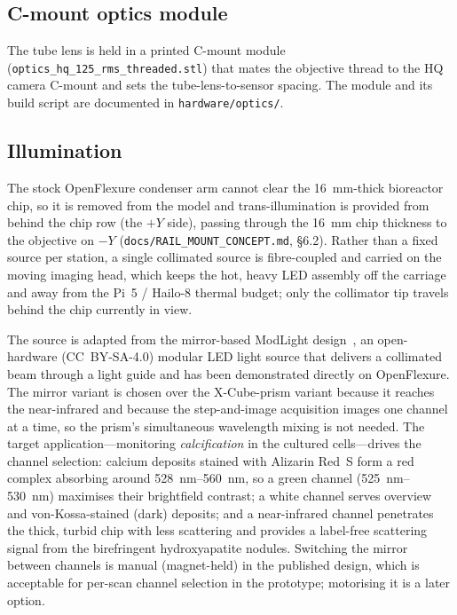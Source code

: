 \subsection{C-mount optics module}
The tube lens is held in a printed C-mount module
(\texttt{optics\_hq\_125\_rms\_threaded.stl}) that mates the objective thread to
the HQ camera C-mount and sets the tube-lens-to-sensor spacing. The module and
its build script are documented in \texttt{hardware/optics/}.

\subsection{Illumination}
The stock OpenFlexure condenser arm cannot clear the \SI{16}{\milli\meter}-thick
bioreactor chip, so it is removed from the model and trans-illumination is
provided from behind the chip row (the $+Y$ side), passing through the
\SI{16}{\milli\meter} chip thickness to the objective on $-Y$
(\texttt{docs/RAIL\_MOUNT\_CONCEPT.md}, \S6.2). Rather than a fixed source per
station, a single collimated source is fibre-coupled and carried on the moving
imaging head, which keeps the hot, heavy LED assembly off the carriage and away
from the Pi~5 / Hailo-8 thermal budget; only the collimator tip travels behind
the chip currently in view.

The source is adapted from the mirror-based ModLight design~\cite{Gibson2023},
an open-hardware (CC~BY-SA-4.0) modular LED light source that delivers a
collimated beam through a light guide and has been demonstrated directly on
OpenFlexure. The mirror variant is chosen over the X-Cube-prism variant because
it reaches the near-infrared and because the step-and-image acquisition images
one channel at a time, so the prism's simultaneous wavelength mixing is not
needed. The target application---monitoring \emph{calcification} in the cultured
cells---drives the channel selection: calcium deposits stained with Alizarin
Red~S form a red complex absorbing around \SIrange{528}{560}{\nano\meter}, so a
green channel (\SIrange{525}{530}{\nano\meter}) maximises their brightfield
contrast; a white channel serves overview and von-Kossa-stained (dark) deposits;
and a near-infrared channel penetrates the thick, turbid chip with less
scattering and provides a label-free scattering signal from the birefringent
hydroxyapatite nodules. Switching the mirror between channels is manual
(magnet-held) in the published design, which is acceptable for per-scan channel
selection in the prototype; motorising it is a later option. 

